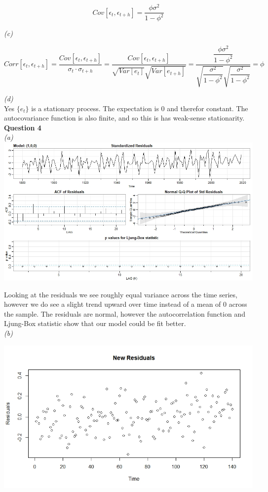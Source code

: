 \documentclass[11pt,a4paper]{article}
\begin{document}
$$ Cov [ \epsilon_t, \epsilon_{t+h} ] = \dfrac{\phi \sigma^2}{1 - \phi^2} $$

\textit{(c)}

$$ Corr [ \epsilon_t, \epsilon_{t+h} ] = \dfrac{Cov [ \epsilon_t, \epsilon_{t+h} ]}{\sigma_t \cdot \sigma_{t+h}} = \dfrac{Cov [ \epsilon_t, \epsilon_{t+h} ]}{\sqrt{ Var [ e_t ] } \sqrt{ Var [ e_{t+h} ] }} = \dfrac{\dfrac{\phi \sigma^2}{1 - \phi^2}}{\sqrt{\dfrac{\sigma^2}{1 - \phi^2}} \sqrt{\dfrac{\sigma^2}{1 - \phi^2}}} = \phi $$

\textit{(d)}\\

Yes $\lbrace e_t \rbrace $ is a stationary process. The expectation is 0 and therefor constant. The autocovariance function is also finite, and so this is has weak-sense stationarity.\\

\newpage
\textbf{Question 4}\\

\textit{(a)}\\

\includegraphics[width=\textwidth]{time_resid_1.jpeg}

Looking at the residuals we see roughly equal variance across the time series, however we do see a slight trend upward over time instead of a mean of 0 across the sample. The residuals are normal, however the autocorrelation function and Ljung-Box statistic show that our model could be fit better.\\

\textit{(b)}

\begin{center}
\includegraphics[scale = 0.8]{newres_ar1.jpeg}
\end{center}
\end{document}
